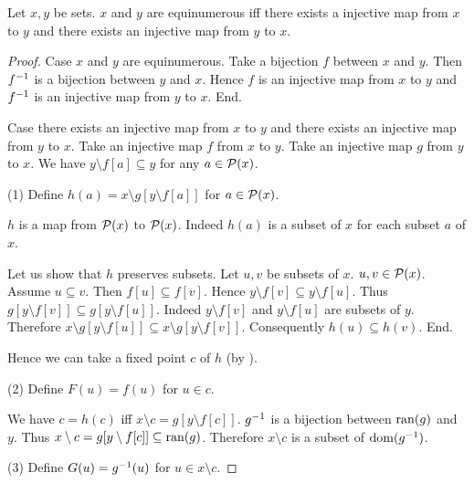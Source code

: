 \documentclass{article}
\begin{document}
 \begin{forthel}

   \begin{theorem*}\label{CSB}
      Let $x,y$ be sets.
      $x$ and $y$ are equinumerous iff there exists a injective map from $x$ to
      $y$ and there exists an injective map from $y$ to $x$.
    \end{theorem*}
    \begin{proof}
      Case $x$ and $y$ are equinumerous.
        Take a bijection $f$ between $x$ and $y$.
        Then $f^{-1}$ is a bijection between $y$ and $x$.
        Hence $f$ is an injective map from $x$ to $y$ and $f^{-1}$ is an
        injective map from $y$ to $x$.
      End.

      Case there exists an injective map from $x$ to $y$ and there exists an
      injective map from $y$ to $x$.
        Take an injective map $f$ from $x$ to $y$.
        Take an injective map $g$ from $y$ to $x$.
        We have $y \setminus f[a] \subseteq y$ for any $a \in {\cal P}(x)$.

        (1) Define $h(a) = x \setminus g[y \setminus f[a]]$ for $a \in {\cal P}(x)$.

        $h$ is a map from ${\cal P}(x)$ to ${\cal P}(x)$.
        Indeed $h(a)$ is a subset of $x$ for each subset $a$ of $x$.

        Let us show that $h$ preserves subsets.
          Let $u, v$ be subsets of $x$. $u,v \in {\cal P}(x)$.
          Assume $u \subseteq v$.
          Then $f[u] \subseteq f[v]$.
          Hence $y \setminus f[v] \subseteq y \setminus f[u]$.
          Thus $g[y \setminus f[v]] \subseteq g[y \setminus f[u]]$.
          Indeed $y \setminus f[v]$ and $y \setminus f[u]$ are subsets of $y$.
          Therefore $x \setminus g[y \setminus f[u]] \subseteq
          x \setminus g[y \setminus f[v]]$.
          Consequently $h(u) \subseteq h(v)$. 
        End.

        Hence we can take a fixed point $c$ of $h$ (by ).

        (2) Define $F(u) = f(u)$ for $u \in c$.

        We have $c = h(c)$ iff $x \setminus c = g[y \setminus f[c]]$.
        $g^{-1}$ is a bijection between $\operatorname{ran}(g)$ and $y$.
        Thus $x \setminus c = g[y \setminus f[c]] \subseteq \operatorname{ran}(g)$.
        Therefore $x \setminus c$ is a subset of $\operatorname{dom}(g^{-1})$.

        (3) Define $G(u) = g^{-1}(u)$ for $u \in x \setminus c$.


\end{proof}
\end{forthel}
\end{document}
